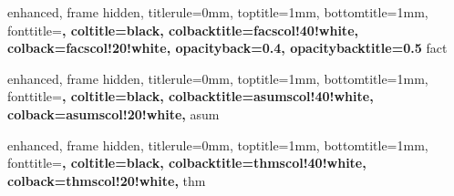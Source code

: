 
{
  enhanced,
  frame hidden,
  titlerule=0mm,
  toptitle=1mm,
  bottomtitle=1mm,
  fonttitle=\bfseries\large,
  coltitle=black,
  colbacktitle=facscol!40!white,
  colback=facscol!20!white,
  opacityback=0.4, %
  opacitybacktitle=0.5
}{fact}


{
  enhanced,
  frame hidden,
  titlerule=0mm,
  toptitle=1mm,
  bottomtitle=1mm,
  fonttitle=\bfseries\large,
  coltitle=black,
  colbacktitle=asumscol!40!white,
  colback=asumscol!20!white,
}{asum}



{
  enhanced,
  frame hidden,
  titlerule=0mm,
  toptitle=1mm,
  bottomtitle=1mm,
  fonttitle=\bfseries\large,
  coltitle=black,
  colbacktitle=thmscol!40!white,
  colback=thmscol!20!white,
}{thm}


\newenvironment{pr_questions}{
  \tcolorbox[blanker,breakable,left=5mm,parbox=false,
    before upper={\parindent15pt},
    after skip=10pt,
    borderline west={1mm}{0pt}{softmint!70!white}, %
  colback=white!0] %
}{
  \endtcolorbox
}


